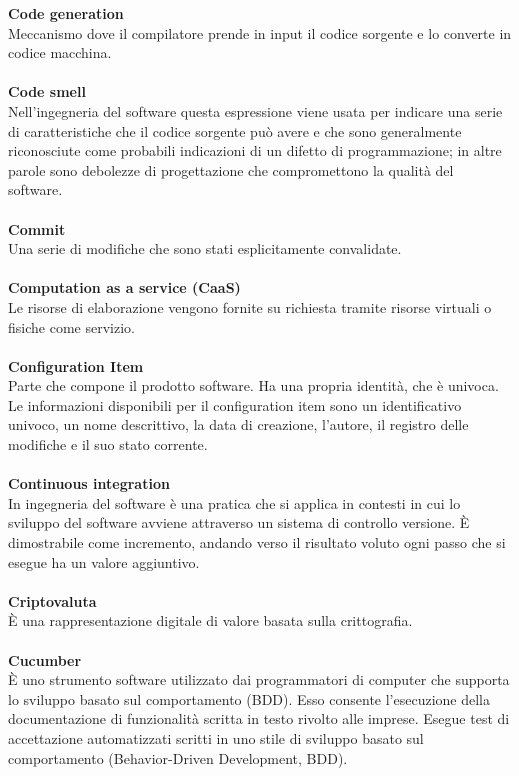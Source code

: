 \textbf{Code generation}\\
Meccanismo dove il compilatore prende in input il codice sorgente e lo converte in codice macchina. \\ \\
\textbf{Code smell}\\ 
Nell'ingegneria del software questa espressione viene usata per indicare una serie di caratteristiche che il codice sorgente può avere e che sono generalmente riconosciute 
come probabili indicazioni di un difetto di programmazione; in altre parole sono debolezze di progettazione che compromettono la qualità del software. \\ \\
\textbf{Commit}\\
Una serie di modifiche che sono stati esplicitamente convalidate. \\ \\
\textbf{Computation as a service (CaaS)}\\
Le risorse di elaborazione vengono fornite su richiesta tramite risorse virtuali o fisiche come servizio. \\ \\
\textbf{Configuration Item}\\
Parte che compone il prodotto software. Ha una propria identità, che è univoca. Le informazioni disponibili per il configuration item sono un identificativo univoco, un nome descrittivo, la data di creazione, l'autore, il registro delle modifiche e il suo stato corrente.\\ \\
\textbf{Continuous integration}\\ 
In ingegneria del software è una pratica che si applica in contesti in cui lo sviluppo del software avviene attraverso un sistema di controllo versione. 
È dimostrabile come incremento, andando verso il risultato voluto ogni passo che si esegue ha un valore aggiuntivo.\\ \\
\textbf{Criptovaluta}\\
È una rappresentazione digitale di valore basata sulla crittografia. \\ \\
\textbf{Cucumber}\\
È uno strumento software utilizzato dai programmatori di computer che supporta lo sviluppo basato sul comportamento (BDD). Esso consente l'esecuzione della documentazione 
di funzionalità scritta in testo rivolto alle imprese. Esegue test di accettazione automatizzati scritti in uno stile di sviluppo basato sul comportamento (Behavior-Driven 
Development, BDD). \\ \\
\clearpage